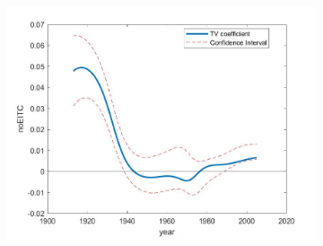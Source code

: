 \documentclass[12pt,a4paper]{article}
\begin{document}
\begin{figure}[!htp]
	\caption{Time-varying Coefficient of noEITC and PE}
	\centering
	\begin{subfigure}[b]{0.7\linewidth}
		\includegraphics[width=\linewidth]{CI_n301.jpg}
	\end{subfigure}
\end{figure}





\end{document}
